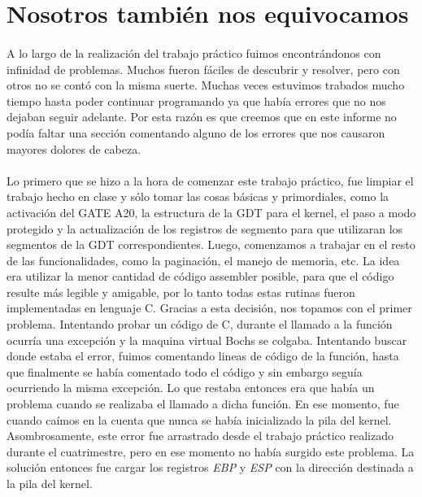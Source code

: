 \documentclass[11pt, a4paper]{article}
\begin{document}
\section{Nosotros también nos equivocamos}
	\paragraph{}
	A lo largo de la realización del trabajo práctico fuimos encontrándonos con infinidad de problemas. Muchos fueron fáciles de descubrir y resolver, pero con otros no se contó con la misma suerte. Muchas veces estuvimos trabados mucho tiempo hasta poder continuar programando ya que había errores que no nos dejaban seguir adelante. Por esta razón es que creemos que en este informe no podía faltar una sección comentando alguno de los errores que nos causaron mayores dolores de cabeza.

	\paragraph{}
	Lo primero que se hizo a la hora de comenzar este trabajo práctico, fue limpiar el trabajo hecho en clase y sólo tomar las cosas básicas y primordiales, como la activación del GATE A20, la estructura de la GDT para el kernel, el paso a modo protegido y la actualización de los registros de segmento para que utilizaran los segmentos de la GDT correspondientes. Luego, comenzamos a trabajar en el resto de las funcionalidades, como la paginación, el manejo de memoria, etc. La idea era utilizar la menor cantidad de código assembler posible, para que el código resulte más legible y amigable, por lo tanto todas estas rutinas fueron implementadas en lenguaje C. Gracias a esta decisión, nos topamos con el primer problema. Intentando probar un código de C, durante el llamado a la función ocurría una excepción y la maquina virtual Bochs se colgaba. Intentando buscar donde estaba el error, fuimos comentando lineas de código de la función, hasta que finalmente se había comentado todo el código y sin embargo seguía ocurriendo la misma excepción. Lo que restaba entonces era que había un problema cuando se realizaba el llamado a dicha función. En ese momento, fue cuando caímos en la cuenta que nunca se había inicializado la pila del kernel. Asombrosamente, este error fue arrastrado desde el trabajo práctico realizado durante el cuatrimestre, pero en ese momento no había surgido este problema. La solución entonces fue cargar los registros \textit{EBP} y \textit{ESP} con la dirección destinada a la pila del kernel.
\end{document}
